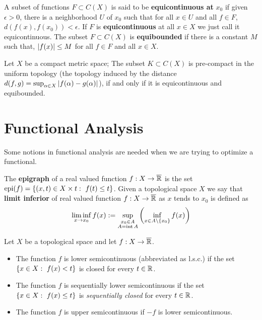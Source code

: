 A subset of functions $F\subset C(X)$ is said to be \textbf{equicontinuous at} $x_0$ if given $\epsilon>0$, there is a neighborhood $U$ of $x_0$ such that for all $x\in U$ and all $f\in F$, $d(f(x), f(x_0))<\epsilon$. If $F$ is \textbf{equicontinuous} at all $x\in X$ we just call it equicontinuous. The subset $F\subset C(X)$ is \textbf{equibounded} if there is a constant $M$ such that, $\left| f(x) \right|\leq M$ for all $f\in F$ and all $x\in X$.
\begin{theorem}
	Let $X$ be a compact metric space;  The subset $K\subset C(X)$ is pre-compact in the uniform topology (the topology induced by the distance $d(f,g)=\sup_{\alpha\in X} \left| f(\alpha)-g(\alpha) \right|$), if and only if it is equicontinuous and equibounded.
\end{theorem}

\section{Functional Analysis}
Some notions in functional analysis are needed when we are trying to optimize a functional. 


The \textbf{epigraph} of a real valued function $f:X\rightarrow \overline{\mathbb{R}}$ is the set $\mathrm{epi}(f)=\left\lbrace (x,t)\in X\times t:\ f(t)\leq t \right\rbrace$. Given a topological space $X$ we say that \textbf{limit inferior} of real valued function $f:X\rightarrow \overline{\mathbb{R}}$ as $x$ tends to $x_0$ is defined as
\begin{equation*}
	\liminf_{x\rightarrow x_0} f(x):=\sup_{\substack{x_0\in A\\A=\mathrm{int}\, A}} \left( \inf_{x\in A\backslash \left\lbrace x_0 \right\rbrace} f(x) \right)
\end{equation*}
\begin{definition}
	\label{def: l.s.c.}
	Let $X$ be a topological space and let $f:X\rightarrow \overline{\mathbb{R}}$.
	\begin{itemize}
		\item The function $f$ is lower semicontinuous (abbreviated as l.s.c.) if the set $\left\lbrace x\in X:\ f(x)<t \right\rbrace$ is closed for every $t\in \mathbb{R}$.
		\item The function $f$ is sequentially lower semicontinuous if the set $\left\lbrace x \in X:\ f(x)\leq t \right\rbrace$ is \emph{sequentially closed} for every $t\in \mathbb{R}$.
		\item The function $f$ is upper semicontinuous if $-f$ is lower semicontinuous.   
	\end{itemize}
\end{definition}	 


